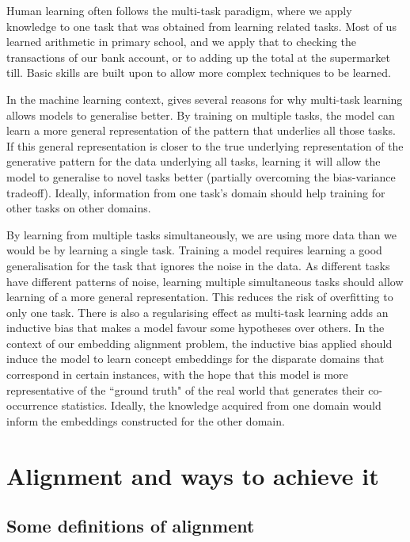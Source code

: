 Human learning often follows the multi-task paradigm, where we apply knowledge to one task that was obtained from learning related tasks. Most of us learned arithmetic in primary school, and we apply that to checking the transactions of our bank account, or to adding up the total at the supermarket till. Basic skills are built upon to allow more complex techniques to be learned. 

In the machine learning context, \cite{OverviewMultiTaskLearning} gives several reasons for why multi-task learning allows models to generalise better. By training on multiple tasks, the model can learn a more general representation of the pattern that underlies all those tasks. If this general representation is closer to the true underlying representation of the generative pattern for the data underlying all tasks, learning it will allow the model to generalise to novel tasks better (partially overcoming the bias-variance tradeoff). Ideally, information from one task's domain should help training for other tasks on other domains.

By learning from multiple tasks simultaneously, we are using more data than we would be by learning a single task. Training a model requires learning a good generalisation for the task that ignores the noise in the data. As different tasks have different patterns of noise, learning multiple simultaneous tasks should allow learning of a more general representation. This reduces the risk of overfitting to only one task. There is also a regularising effect as multi-task learning adds an inductive bias that makes a model favour some hypotheses over others. In the context of our embedding alignment problem, the inductive bias applied should induce the model to learn concept embeddings for the disparate domains that correspond in certain instances, with the hope that this model is more representative of the ``ground truth" of the real world that generates their co-occurrence statistics. Ideally, the knowledge acquired from one domain would inform the embeddings constructed for the other domain. 

\newpage
\section{Alignment and ways to achieve it}
    
\subsection{Some definitions of alignment}


